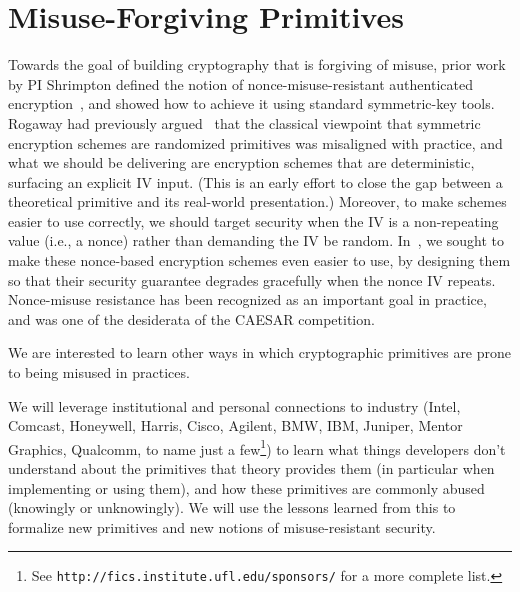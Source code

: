\section{Misuse-Forgiving Primitives}
Towards the goal of building cryptography that is forgiving of misuse, prior
work by PI Shrimpton defined the notion of nonce-misuse-resistant authenticated
encryption~\cite{RS06}, and showed how to achieve it using standard
symmetric-key tools.  Rogaway had previously argued~\cite{Rog04} that the
classical viewpoint that symmetric encryption schemes are randomized primitives
was misaligned with practice, and what we should be delivering are encryption
schemes that are deterministic, surfacing an explicit IV input. (This is an
early effort to close the gap between a theoretical primitive and its real-world
presentation.)  Moreover, to make schemes easier to use correctly, we should
target security when the IV is a non-repeating value (i.e., a nonce) rather than
demanding the IV be random.  In~\cite{RS06}, we sought to make these nonce-based
encryption schemes even easier to use, by designing them so that their security
guarantee degrades gracefully when the nonce IV repeats.  Nonce-misuse
resistance has been recognized as an important goal in practice, and was one of the
desiderata of the CAESAR competition.
%

We are interested to learn other ways in which cryptographic
primitives are prone to being misused in practices.
\begin{task}
We will leverage institutional and personal connections to industry (Intel,
Comcast, Honeywell, Harris, Cisco, Agilent, BMW, IBM, Juniper, Mentor
Graphics, Qualcomm, to name just a few\footnote{See
  \texttt{http://fics.institute.ufl.edu/sponsors/} for a more complete
  list.}) to learn what things developers don't understand about the
primitives that theory provides them (in particular when implementing
or using them), and how these primitives are commonly abused (knowingly or
unknowingly).  We will use the lessons learned from this to formalize
new primitives and new notions of misuse-resistant security.
\end{task}

